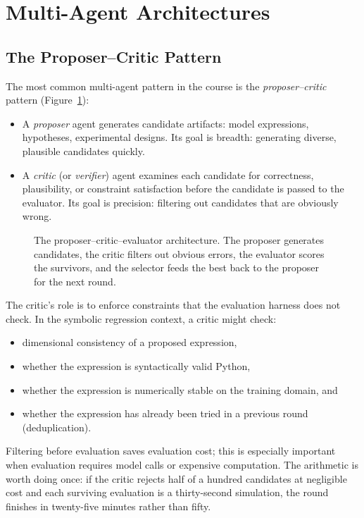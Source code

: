 \section{Multi-Agent Architectures}
\label{section:MultiAgentArchitectures}

\subsection{The Proposer--Critic Pattern}

The most common multi-agent pattern in the course is the \emph{proposer--critic} pattern (Figure~\ref{figure:ProposerCritic}):
\begin{itemize}
\item A \emph{proposer} agent generates candidate artifacts: model expressions, hypotheses, experimental designs.
Its goal is breadth: generating diverse, plausible candidates quickly.
\item A \emph{critic} (or \emph{verifier}) agent examines each candidate for correctness, plausibility, or constraint satisfaction before the candidate is passed to the evaluator.
Its goal is precision: filtering out candidates that are obviously wrong.
\end{itemize}

\begin{figure}[htb!]
\begin{center}

\caption{The proposer--critic--evaluator architecture.
The proposer generates candidates, the critic filters out obvious errors, the evaluator scores the survivors, and the selector feeds the best back to the proposer for the next round.}
\label{figure:ProposerCritic}
\end{center}
\end{figure}

The critic's role is to enforce constraints that the evaluation harness does not check.
In the symbolic regression context, a critic might check:
\begin{itemize}
\item dimensional consistency of a proposed expression,
\item whether the expression is syntactically valid Python,
\item whether the expression is numerically stable on the training domain, and
\item whether the expression has already been tried in a previous round (deduplication).
\end{itemize}
Filtering before evaluation saves evaluation cost; this is especially important when evaluation requires model calls or expensive computation.
The arithmetic is worth doing once: if the critic rejects half of a hundred candidates at negligible cost and each surviving evaluation is a thirty-second simulation, the round finishes in twenty-five minutes rather than fifty.

